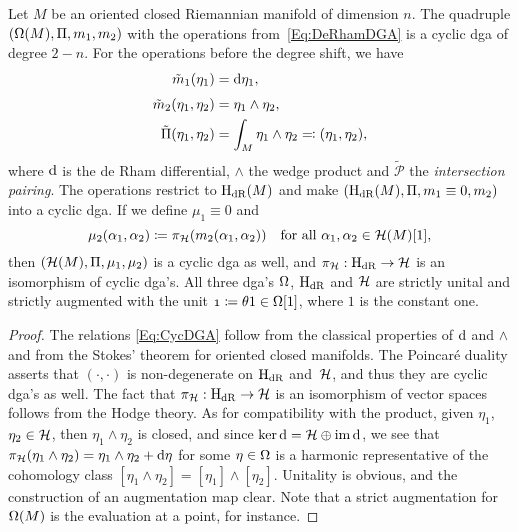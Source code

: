 \documentclass[\MainFolder/Text.tex]{subfiles}
\begin{document}
\begin{Proposition}\label{Prop:DGAs}
Let $M$ be an oriented closed Riemannian manifold of dimension $n$. The quadruple $(\Omega(M), \Pi, m_1, m_2)$ with the operations from~\eqref{Eq:DeRhamDGA} is a cyclic dga of degree $2-n$.
For the operations before the degree shift, we have
\begin{align*}
\tilde{m}_1(\eta_1) & = \mathrm{d} \eta_1, \\[\jot]
\tilde{m}_2(\eta_1, \eta_2) &= \eta_1 \wedge \eta_2, \\ 
\tilde{\Pi}(\eta_1, \eta_2) &=  \int_M \eta_1 \wedge \eta_2 \eqqcolon (\eta_1,\eta_2),
\end{align*}
where $\mathrm{d}$ is the de Rham differential, $\wedge$ the wedge product and $\tilde{\mathcal{P}}$ the \emph{intersection pairing}. 
The operations restrict to $\mathrm{H}_{\mathrm{dR}}(M)$ and make $(\mathrm{H}_{\mathrm{dR}}(M),\Pi,m_1\equiv 0,m_2)$ into a cyclic dga.
If we define $\mu_1 \equiv 0$ and
\begin{equation}\label{Eq:HarmProd}
\mu_2(\alpha_1, \alpha_2) \coloneqq \pi_{\mathcal{H}}(m_2(\alpha_1, \alpha_2))\quad \text{for all }\alpha_1, \alpha_2 \in \mathcal{H}(M)[1],
\end{equation}
then $(\mathcal{H}(M), \Pi, \mu_1, \mu_2)$ is a cyclic dga as well, and $\pi_{\mathcal{H}}: \mathrm{H}_{\mathrm{dR}} \rightarrow \mathcal{H}$ is an isomorphism of cyclic dga's.
All three dga's $\Omega$, $\mathrm{H}_{\mathrm{dR}}$ and $\mathcal{H}$ are strictly unital and strictly augmented with the unit $\NOne\coloneqq \SuspU 1 \in \DR[1]$, where $1$ is the constant one.
\end{Proposition}

\begin{proof}
The relations \eqref{Eq:CycDGA} follow from the classical properties of $\mathrm{d}$ and $\wedge$ and from the Stokes' theorem for oriented closed manifolds.
The Poincar\'e duality asserts that $(\cdot,\cdot)$ is non-degenerate on $\mathrm{H}_{\mathrm{dR}}{}$ and~$\mathcal{H}{}$, and thus they are cyclic dga's as well.
The fact that $\pi_{\mathcal{H}} : \mathrm{H}_{\mathrm{dR}}{}\rightarrow \mathcal{H}{}$ is an isomorphism of vector spaces follows from the Hodge theory.
As for compatibility with the product, given $\eta_1$, $\eta_2 \in \mathcal{H}{}$, then $\eta_1 \wedge \eta_2$ is closed, and since $\operatorname{ker} \mathrm{d} = \mathcal{H} \oplus \operatorname{im} \mathrm{d}$, we see that $\pi_{\mathcal{H}}(\eta_1 \wedge \eta_2) = \eta_1 \wedge \eta_2 + \mathrm{d} \eta$ for some $\eta\in \Omega$ is a harmonic representative of the cohomology class $[\eta_1 \wedge \eta_2] = [\eta_1] \wedge [\eta_2]$.
Unitality is obvious, and the construction of an augmentation map clear.
Note that a strict augmentation for $\Omega(M)$ is the evaluation at a point, for instance. 
\end{proof}
\end{document}
